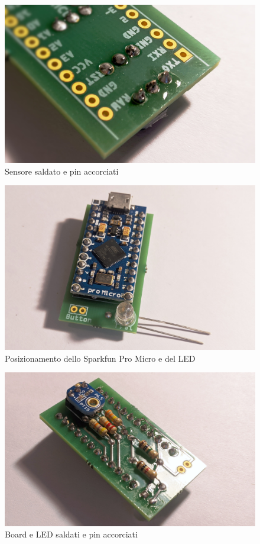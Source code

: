 \begin{figure}[H]
	\centering
	\includegraphics[width=\textwidth]{Dispositivo_files/assembly_07.jpg}
	\caption{Sensore saldato e pin accorciati}
	\label{fig:assembly_07}
\end{figure}

\begin{figure}[H]
	\centering
	\includegraphics[width=\textwidth]{Dispositivo_files/assembly_08.jpg}
	\caption{Posizionamento dello Sparkfun Pro Micro e del LED}
	\label{fig:assembly_08}
\end{figure}

\begin{figure}[H]
	\centering
	\includegraphics[width=\textwidth]{Dispositivo_files/assembly_09.jpg}
	\caption{Board e LED saldati e pin accorciati}
	\label{fig:assembly_09}
\end{figure}

